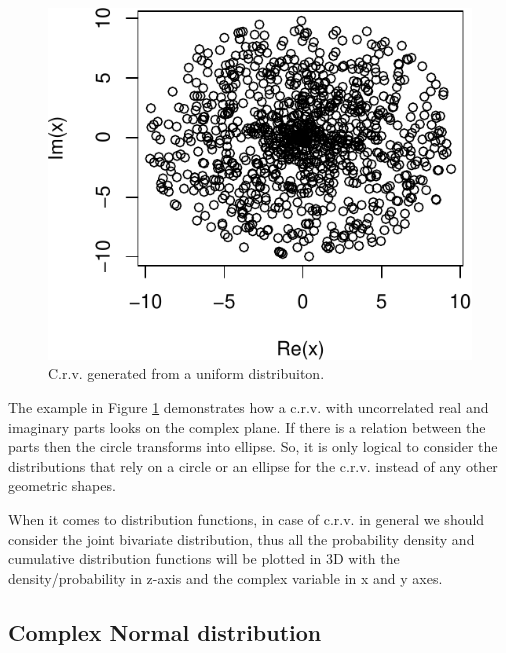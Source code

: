 \documentclass[
]{book}
\begin{document}
\begin{figure}
\centering
\includegraphics{Svetunkov---Svetunkov---Complex-Valued-Econometrics_files/figure-latex/crvGeneratedCircle-1.pdf}
\caption{\label{fig:crvGeneratedCircle}C.r.v. generated from a uniform distribuiton.}
\end{figure}

The example in Figure \ref{fig:crvGeneratedCircle} demonstrates how a c.r.v. with uncorrelated real and imaginary parts looks on the complex plane. If there is a relation between the parts then the circle transforms into ellipse. So, it is only logical to consider the distributions that rely on a circle or an ellipse for the c.r.v. instead of any other geometric shapes.

When it comes to distribution functions, in case of c.r.v. in general we should consider the joint bivariate distribution, thus all the probability density and cumulative distribution functions will be plotted in 3D with the density/probability in z-axis and the complex variable in x and y axes.

\hypertarget{distributionCNorm}{%
\subsection{Complex Normal distribution}\label{distributionCNorm}}
\end{document}
